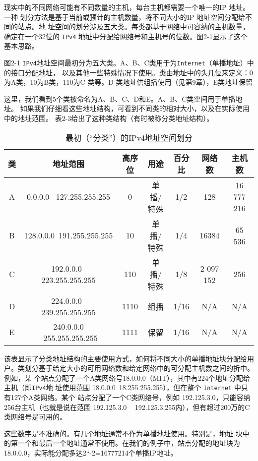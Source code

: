 现实中的不同网络可能有不同数量的主机，每台主机都需要一个唯一的IP 地址。一种
划分方法是基于当前或预计的主机数量，将不同大小的IP 地址空间分配给不同的站点。地
址空间的划分涉及五大类。每类都基于网络中可容纳的主机数量，确定在一个32位的 \verb|IPv4|
地址中分配给网络号和主机号的位数。图2-1显示了这个基本思路。

图2-1 \verb|IPv4|地址空间最初分为五大类。A、B、C类用于为\verb|Internet|（单播地址）中的接口分配地址，
以及其他一些特殊情况下使用。类由地址中的头几位来定义：0为A类，10为B类，110为C
类等。D 类地址供组播使用（见第9章），E类地址保留

这里，我们看到5个类被命名为A、B、C、D和E。A、B、C类空间用于单播地址。
如果我们仔细看这些地址结构，可看到不同类的相对大小，以及在实际使用中的地址范围。
表2-3给出了这种类结构（有时被称分类地址结构）。

\begin{table}[H]
    \centering
    \caption{最初（“分类”）的IPv4地址空间划分}
    \begin{tabular}{c|c|c|c|c|c|c}
        \hline
        类	&	地址范围	&	高序位	&	用途	&	百分比	&	网络数	&	主机数 \\ \hline
        A	&	0.0.0.0~ 127.255.255.255	&	0	&	单播/特殊	&	1/2	&	128	&	16 777 216 \\ \hline
        B	&	128.0.0.0~191.255.255.255	&	10	&	单播/特殊	&	1/4	&	16384	&	65 536 \\ \hline
        C	&	192.0.0.0~ 223.255.255.255	&	110	&	单播/特殊	&	1/8	&	2 097 152	&	256 \\ \hline
        D	&	224.0.0.0~ 239.255.255.255	&	1110	&	组播	&	1/16	&	N/A	&	N/A \\ \hline
        E	&	240.0.0.0 ~255.255.255.255	&	1111	&	保留	&	1/16	&	N/A	&	N/A \\ \hline
    \end{tabular}
\end{table}

该表显示了分类地址结构的主要使用方式，如何将不同大小的单播地址块分配给用
户。类划分基于给定大小的可用网络数和给定网络中的可分配主机数之间的折中。例如，某
个站点分配了一个A类网络号18.0.0.0（MIT），其中有224个地址分配给主机（即\verb|IPv4|地
址使用范围 18.0.0.0~18.255.255.255），但在整个 \verb|Internet| 中只有127个A类网络。某个
站点分配了一个C类网络号，例如 192.125.3.0，只能容纳256台主机（也就是说在范围
192.125.3.0 ~ 192.125.3.255内），但有超过200万的C类网络号是可用的。

\begin{tcolorbox}
    这些数字是不准确的。有几个地址通常不作为单播地址使用。特别是，地址
    块中的第一个和最后一个地址通常不使用。在我们的例子中，站点分配的地址块为
    18.0.0.0，实际能分配多达2“-2=16777214个单播IP地址。
\end{tcolorbox}

